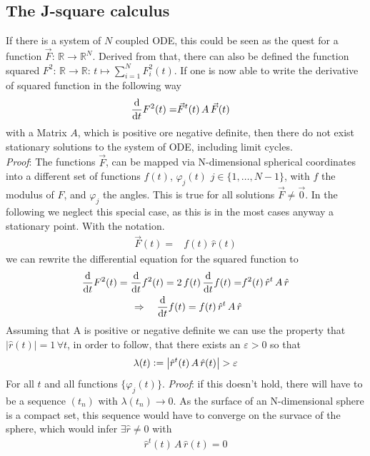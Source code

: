 \documentclass{article}
\begin{document}
\subsection*{The J-square calculus}
If there is a system of $N$ coupled ODE, this could be seen as the quest for a function $\vec{F}:\,\mathbb{R}\rightarrow\mathbb{R}^N$. Derived from that, there can also be defined the function squared $F^2:\,\mathbb{R}\rightarrow\mathbb{R}:\,t\mapsto\sum_{i=1}^NF_i^2(t)$. If one is now able to write the derivative of squared function in the following way
\begin{align*}
    \frac{\text{d}}{\text{d}t} F^2(t)=&\vec{F}^t(t)\,A\,\vec{F}(t)
\end{align*}
with a Matrix $A$, which is positive ore negative definite, then there do not exist stationary solutions to the system of ODE, including limit cycles. \\
\textit{Proof}: The functions $\vec{F}$, can be mapped via N-dimensional spherical coordinates into a different set of functions $f(t)$, $\varphi_j(t)$ $j\in\{1,\dots,N-1\}$, with $f$ the modulus of $F$, and $\varphi_j$ the angles. This is true for all solutions $\vec{F}\neq\vec{0}$. In the following we neglect this special case, as this is in the most cases anyway a stationary point. With the notation.
\begin{align*}
    \vec{F}(t)=&f(t)\,\hat{r}(t)
\end{align*}
we can rewrite the differential equation for the squared function to
\begin{align*}
    \frac{\text{d}}{\text{d}t} F^2(t)=\frac{\text{d}}{\text{d}t} f^2(t)=2\,f(t)\,\frac{\text{d}}{\text{d}t} f(t)=&f^2(t)\,\hat{r}^t\,A\,\hat{r}\\
    \Rightarrow\quad\frac{\text{d}}{\text{d}t} f(t) = f(t)\,\hat{r}^t\,A\,\hat{r}
\end{align*}
Assuming that A is positive or negative definite we can use the property that $|\hat{r}(t)|=1\,\forall t$, in order to follow, that there exists an $\varepsilon>0$ so that
\begin{align*}
    \lambda(t)\vcentcolon=\left| \hat{r}^t(t)\,A\,\hat{r}(t) \right| > \varepsilon
\end{align*}
For all $t$ and all functions $\{\varphi_j(t)\}$. \textit{Proof}: if this doesn't hold, there will have to be a sequence $(t_n)$ with $\lambda(t_n)\rightarrow0$. As the surface of an N-dimensional sphere is a compact set, this sequence would have to converge on the survace of the sphere, which would infer $\exists \hat{r}\neq0$ with 
\begin{align*}
    \hat{r}^t(t)\,A\,\hat{r}(t)=0
\end{align*}
\end{document}
